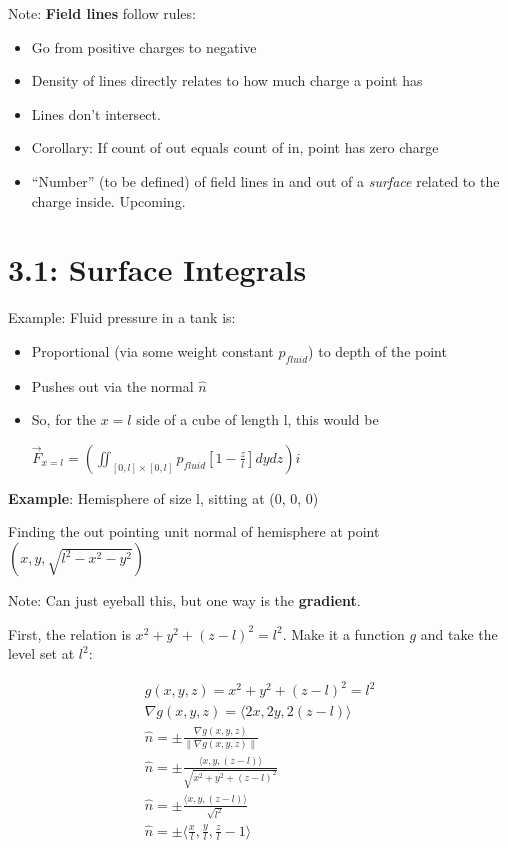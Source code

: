 \documentclass[11pt, oneside]{article}   	%
\begin{document}
Note: \textbf{Field lines} follow rules:
\begin{itemize}
\item Go from positive charges to negative
\item Density of lines directly relates to how much charge a point has
\item Lines don't intersect.
\item Corollary: If count of out equals count of in, point has zero charge
\item ``Number'' (to be defined) of field lines in and out of a \emph{surface} related to the charge inside.  Upcoming.
\end{itemize}

\section{3.1: Surface Integrals}

Example: Fluid pressure in a tank is:
\begin{itemize}
\item Proportional (via some weight constant $p_{fluid}$) to depth of the point
\item Pushes out via the normal $\hat{n}$ 
\item So, for the $x=l$ side of a cube of length l, this would be 

$\vec{F}_{x=l} = (\iint_{[0,l] \times [0,l]} p_{fluid} [1 - \frac{z}{l}] dy dz) \hat{i}$
\end{itemize}



\textbf{Example}: Hemisphere of size l, sitting at (0, 0, 0)

Finding the out pointing unit normal of hemisphere at point $(x, y, \sqrt{l^2-x^2-y^2})$

Note: Can just eyeball this, but one way is the \textbf{gradient}.  

First, the relation is $x^2 + y^2 + (z-l)^2 = l^2$.
Make it a function $g$ and take the level set at $l^2$:

\begin{align}
g(x,y,z) = x^2  + y^2 + (z - l)^2 = l^2 \\
\nabla g(x,y,z) = \langle 2x , 2y , 2(z-l)  \rangle \\
\hat{n} = \pm \frac{\nabla g(x,y,z)}{ \|\nabla g(x,y,z) \|} \\ 
\hat{n} = \pm \frac{\langle x , y , (z-l)  \rangle}{\sqrt{x^2 + y^2 + (z-l)^2}} \\
\hat{n} = \pm \frac{\langle x , y , (z-l) \rangle}{\sqrt{l^2}} \\
\hat{n} = \pm \langle \frac{x}{l}, \frac{y}{l} ,\frac{z}{l} - 1\rangle \\
\end{align}
\end{document}
